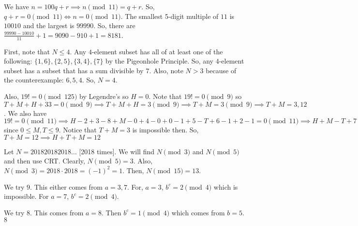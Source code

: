 \documentclass[11pt]{article}
\begin{document}
\begin{sol}
We have $n=100q+r\implies n\pmod{11}=q+r$. So, $q+r=0\pmod{11}\iff n=0\pmod{11}$. The smallest 5-digit multiple of $11$ is $10010$ and the largest is $99990$. So, there are $\frac{99990-10010}{11}+1=9090-910+1=\boxed{8181}$.
\end{sol}


\begin{sol}
First, note that $N\leq 4$. Any $4$-element subset has all of at least one of the following: $\{1,6\},\{2,5\},\{3,4\},\{7\}$ by the Pigeonhole Principle. So, any $4$-element subset has a subset that has a sum divisible by $7$. Also, note $N>3$ because of the counterexample: $6,5,4$. So, $N=\boxed{4}$. 
\end{sol}


\begin{sol}
Also, $19!=0\pmod{125}$ by Legendre's so $H=0$. Note that $19!=0\pmod{9}$ so $T+M+H+33=0\pmod{9}\implies T+M+H=3\pmod{9}\implies T+M=3\pmod{9}\implies T+M=3,12$.  We also have $19!=0\pmod{11}\implies H-2+3-8+M-0+4-0+0-1+5-T+6-1+2-1=0\pmod{11}\implies H+M-T+7=0\pmod{11}\implies H+M-T=4\pmod{11}\implies M-T=4\pmod{11}\implies M-T=4$ since $0\leq M,T\leq 9$. Notice that $T+M=3$ is impossible then. So, $T+M=12\implies H+T+M=\boxed{12}$
\end{sol}


\begin{sol}
Let $N=201820182018\ldots$ [2018 times]. We will find $N\pmod{3}$ and $N\pmod{5}$ and then use CRT. Clearly, $N\pmod{5}=3$. Also, $N\pmod{3}=2018\cdot 2018=(-1)^2=1$. Then, $N\pmod{15}=\boxed{13}$.
\end{sol}


\begin{sol}
We try $9$. This either comes from $a=3,7$. For, $a=3$, $b^c=2\pmod{4}$ which is impossible. For $a=7$, $b^c=2\pmod{4}$.

We try $8$. This comes from $a=8$. Then $b^c=1\pmod{4}$ which comes from $b=5$.
$\boxed{8}$
\end{sol}
\end{document}
